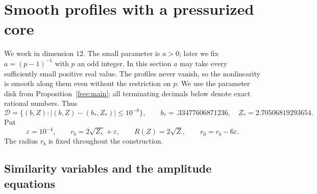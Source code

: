 \documentclass[11pt]{article}
\numberwithin{equation}{section}
\theoremstyle{definition}
\theoremstyle{remark}
\begin{document}
\section{Smooth profiles with a pressurized core}\label{sec:profiles}

We work in dimension $12$.  The small parameter is $a>0$; later we fix
$a=(p-1)^{-1}$ with $p$ an odd integer.  In this section $a$ may take every
sufficiently small positive real value.  The profiles never vanish, so the
nonlinearity is smooth along them even without the restriction on $p$.
We use the parameter disk from Proposition~\ref{free:main}; all
terminating decimals below denote exact rational numbers.  Thus
\[
 \mathcal D=\{(b,Z):|(b,Z)-(b_*,Z_*)|\le10^{-8}\},\qquad
 b_*=.33477606871236,\quad Z_*=2.70506819293654.
\]
Put
\begin{equation}\label{profile:radii}
 \varepsilon=10^{-4},\qquad r_b=2\sqrt{Z_*}+\varepsilon,
 \qquad R(Z)=2\sqrt Z,\qquad r_0=r_b-6\varepsilon.
\end{equation}
The radius $r_b$ is fixed throughout the construction.

\subsection{Similarity variables and the amplitude equations}
\end{document}
